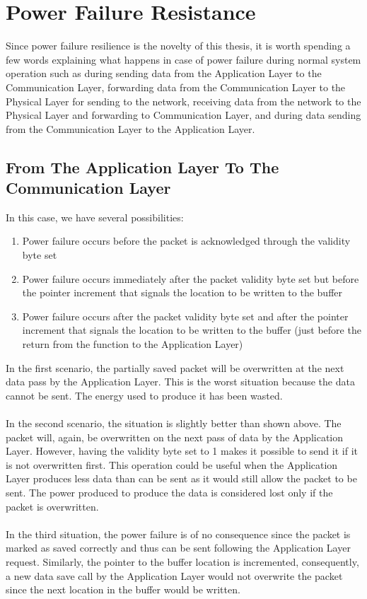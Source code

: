 \section{Power Failure Resistance}
\label{sec:PowerFailureResistance}
Since power failure resilience is the novelty of this thesis, it is worth spending a few words explaining what happens in case of power failure during normal system operation such as during sending data from the Application Layer to the Communication Layer, forwarding data from the Communication Layer to the Physical Layer for sending to the network, receiving data from the network to the Physical Layer and forwarding to Communication Layer, and during data sending from the Communication Layer to the Application Layer.\\
\subsection{From The Application Layer To The Communication Layer}
In this case, we have several possibilities:
\begin{enumerate}
\item Power failure occurs before the packet is acknowledged through the validity byte set
\item Power failure occurs immediately after the packet validity byte set but before the pointer increment that signals the location to be written to the buffer
\item Power failure occurs after the packet validity byte set and after the pointer increment that signals the location to be written to the buffer (just before the return from the function to the Application Layer)
\end{enumerate}
In the first scenario, the partially saved packet will be overwritten at the next data pass by the Application Layer. This is the worst situation because the data cannot be sent. The energy used to produce it has been wasted.\\\\
In the second scenario, the situation is slightly better than shown above. The packet will, again, be overwritten on the next pass of data by the Application Layer. However, having the validity byte set to 1 makes it possible to send it if it is not overwritten first. This operation could be useful when the Application Layer produces less data than can be sent as it would still allow the packet to be sent. The power produced to produce the data is considered lost only if the packet is overwritten.\\\\
In the third situation, the power failure is of no consequence since the packet is marked as saved correctly and thus can be sent following the Application Layer request. Similarly, the pointer to the buffer location is incremented, consequently, a new data save call by the Application Layer would not overwrite the packet since the next location in the buffer would be written.\\
